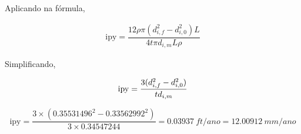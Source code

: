 \documentclass{article}
\begin{document}
Aplicando na fórmula,

\begin{align}
  \mathrm{ipy} = \dfrac{12 \rho \pi (d_{i,f}^2 - d_{i,0}^2) L}{4 t \pi d_{i,m} L \rho}
\end{align}

Simplificando,

\begin{equation}
  \mathrm{ipy} = \frac{3 (d_{i,f}^2 - d_{i,0}^2)}{t d_{i,m}} \\
\end{equation}

\begin{equation}
  \mathrm{ipy} = \frac{3 \times (\num{0.35531496}^2 - \num{0.33562992}^2)}{3 \times \num{0.34547244}} = \SI{0.03937}{ft/ano} = \SI{12.00912}{mm/ano}
\end{equation}
\end{document}

